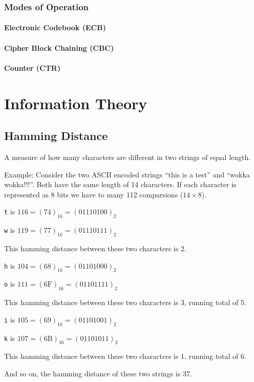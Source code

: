 \documentclass[12pt]{book}
\begin{document}
  \subsection{Modes of Operation}

  \subsubsection{Electronic Codebook (ECB)}

  \subsubsection{Cipher Block Chaining (CBC)}

  \subsubsection{Counter (CTR)}

  \chapter{Information Theory}

  \section{Hamming Distance}

  A measure of how many characters are different in two strings of equal length.

  Example: Consider the two ASCII encoded strings ``this is a test'' and ``wokka
  wokka!!!''. Both have the same length of 14 characters. If each character is
  represented as 8 bits we have to many 112 comparsions ($14 \times 8$).

  \texttt{t} is $116 = (74)_{16} = (01110100)_{2}$

  \texttt{w} is $119 = (77)_{16} = (01110111)_{2}$

  This hamming distance between these two characters is 2.

  \texttt{h} is $104 = (68)_{16} = (01101000)_{2}$

  \texttt{o} is $111 = (6\text{F})_{16} = (01101111)_{2}$

  This hamming distance between these two characters is 3, running total of 5.

  \texttt{i} is $105 = (69)_{16} = (01101001)_{2}$

  \texttt{k} is $107 = (6\text{B})_{16} = (01101011)_{2}$

  This hamming distance between these two characters is 1, running total of 6.

  And so on, the hamming distance of these two strings is 37.
\end{document}
